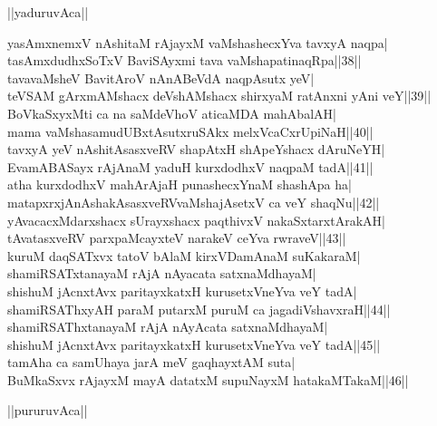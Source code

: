 \documentclass{article}
\begin{document}
\begin{center}
||yaduruvAca||
\end{center}

yasAmxnemxV nAshitaM rAjayxM vaMshashecxYva tavxyA naqpa|\\
tasAmxdudhxSoTxV BaviSAyxmi tava vaMshapatinaqRpa||38||\\
tavavaMsheV BavitAroV nAnABeVdA naqpAsutx yeV|\\
teVSAM gArxmAMshacx deVshAMshacx shirxyaM ratAnxni yAni veY||39||\\
BoVkaSxyxMti ca na saMdeVhoV aticaMDA mahAbalAH|\\
mama vaMshasamudUBxtAsutxruSAkx melxVcaCxrUpiNaH||40||\\
tavxyA yeV nAshitAsasxveRV shapAtxH shApeYshacx dAruNeYH|\\
EvamABASayx rAjAnaM yaduH kurxdodhxV naqpaM tadA||41||\\
atha kurxdodhxV mahArAjaH punashecxYnaM shashApa ha|\\
matapxrxjAnAshakAsasxveRVvaMshajAsetxV ca veY shaqNu||42||\\
yAvacacxMdarxshacx sUrayxshacx paqthivxV nakaSxtarxtArakAH|\\
tAvatasxveRV parxpaMcayxteV narakeV ceYva rwraveV||43||\\
kuruM daqSATxvx tatoV bAlaM kirxVDamAnaM suKakaraM|\\
shamiRSATxtanayaM rAjA nAyacata satxnaMdhayaM|\\
shishuM jAcnxtAvx paritayxkatxH kurusetxVneYva veY tadA|\\
shamiRSAThxyAH paraM putarxM puruM ca jagadiVshavxraH||44||\\
shamiRSAThxtanayaM rAjA nAyAcata satxnaMdhayaM|\\
shishuM jAcnxtAvx paritayxkatxH kurusetxVneYva veY tadA||45||\\
tamAha ca samUhaya jarA meV gaqhayxtAM suta|\\
BuMkaSxvx rAjayxM mayA datatxM supuNayxM hatakaMTakaM||46||\\

\begin{center}
||pururuvAca||
\end{center}
\end{document}
